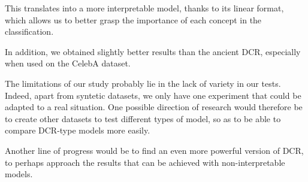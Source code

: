 \documentclass[sigconf, nonacm]{acmart}
\begin{document}
This translates into a more interpretable model, thanks to its linear format, which allows us to better grasp the importance of each concept in the classification.

In addition, we obtained slightly better results than the ancient DCR, especially when used on the CelebA dataset.

The limitations of our study probably lie in the lack of variety in our tests. Indeed, apart from syntetic datasets, we only have one experiment that could be adapted to a real situation. One possible direction of research would therefore be to create other datasets to test different types of model, so as to be able to compare DCR-type models more easily. 

Another line of progress would be to find an even more powerful version of DCR, to perhaps approach the results that can be achieved with non-interpretable models.
\vspace{8pt}




\end{document}
